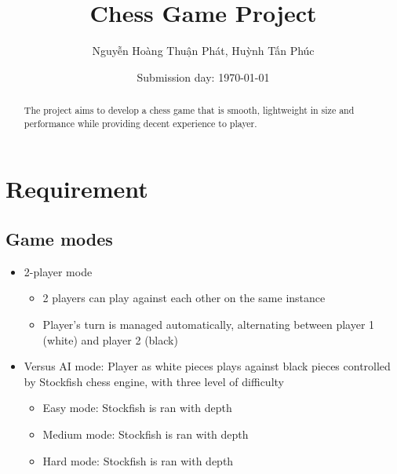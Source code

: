 \documentclass[a4paper, 10pt, titlepage]{report}
\title{Chess Game Project}
\author{Nguyễn Hoàng Thuận Phát, Huỳnh Tấn Phúc}
\date{Submission day: \selectlanguage{english}\today}
\begin{document}
\maketitle
{}
\renewcommand{\abstractname}{Overview}
\begin{abstract}
    The project aims to develop a chess game that is smooth, lightweight in size and performance while providing decent experience to player.
\end{abstract}

\tableofcontents
\chapter{Requirement}

\section{Game modes}
\begin{itemize}
    \item 2-player mode
          \begin{itemize}
              \item 2 players can play against each other on the same instance
              \item Player's turn is managed automatically, alternating between player 1 (white) and player 2 (black)
          \end{itemize}
    \item Versus AI mode: Player as white pieces plays against black pieces controlled by Stockfish chess engine, with three level of difficulty
          \begin{itemize}
              \item Easy mode: Stockfish is ran with depth
              \item Medium mode: Stockfish is ran with depth
              \item Hard mode: Stockfish is ran with depth
          \end{itemize}
\end{itemize}
\end{document}
